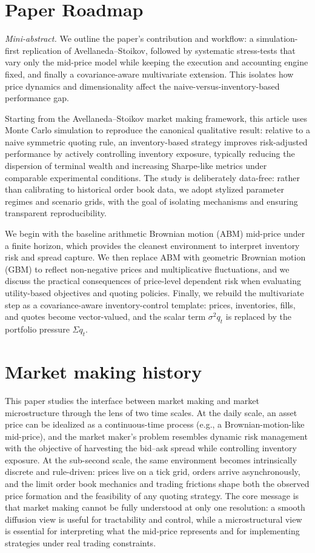 \documentclass[a4paper,10pt,titlepage,oneside,openany]{book}
\theoremstyle{plain}\newtheorem{theorem}{Theorem}[chapter]
\theoremstyle{definition}\newtheorem{definition}{Definition}[chapter]
\theoremstyle{remark}\newtheorem{remark}{Remark}[chapter]
\newcommand{\miniabstract}[1]{%
\vspace{-2pt}
\begin{tcolorbox}[colback=gray!6,colframe=black!15,boxrule=0.3pt,arc=3pt,left=6pt,right=6pt,top=4pt,bottom=4pt]
\textit{Mini-abstract.} #1
\end{tcolorbox}
\vspace{-4pt}
}
\begin{document}
\section*{Paper Roadmap}
\miniabstract{We outline the paper's contribution and workflow: a simulation-first replication of Avellaneda--Stoikov, followed by systematic stress-tests that vary only the mid-price model while keeping the execution and accounting engine fixed, and finally a covariance-aware multivariate extension. This isolates how price dynamics and dimensionality affect the naive-versus-inventory-based performance gap.}

Starting from the Avellaneda--Stoikov market making framework, this article uses Monte Carlo simulation to reproduce the canonical qualitative result: relative to a naive symmetric quoting rule, an inventory-based strategy improves risk-adjusted performance by actively controlling inventory exposure, typically reducing the dispersion of terminal wealth and increasing Sharpe-like metrics under comparable experimental conditions. The study is deliberately data-free: rather than calibrating to historical order book data, we adopt stylized parameter regimes and scenario grids, with the goal of isolating mechanisms and ensuring transparent reproducibility.

We begin with the baseline arithmetic Brownian motion (ABM) mid-price under a finite horizon, which provides the cleanest environment to interpret inventory risk and spread capture. We then replace ABM with geometric Brownian motion (GBM) to reflect non-negative prices and multiplicative fluctuations, and we discuss the practical consequences of price-level dependent risk when evaluating utility-based objectives and quoting policies. Finally, we rebuild the multivariate step as a covariance-aware inventory-control template: prices, inventories, fills, and quotes become vector-valued, and the scalar term $\sigma^2 q_t$ is replaced by the portfolio pressure $\Sigma q_t$.

\section*{Market making history}
This paper studies the interface between market making and market microstructure through the lens of two time scales. At the daily scale, an asset price can be idealized as a continuous-time process (e.g., a Brownian-motion-like mid-price), and the market maker's problem resembles dynamic risk management with the objective of harvesting the bid--ask spread while controlling inventory exposure. At the sub-second scale, the same environment becomes intrinsically discrete and rule-driven: prices live on a tick grid, orders arrive asynchronously, and the limit order book mechanics and trading frictions shape both the observed price formation and the feasibility of any quoting strategy. The core message is that market making cannot be fully understood at only one resolution: a smooth diffusion view is useful for tractability and control, while a microstructural view is essential for interpreting what the mid-price represents and for implementing strategies under real trading constraints.
\end{document}
